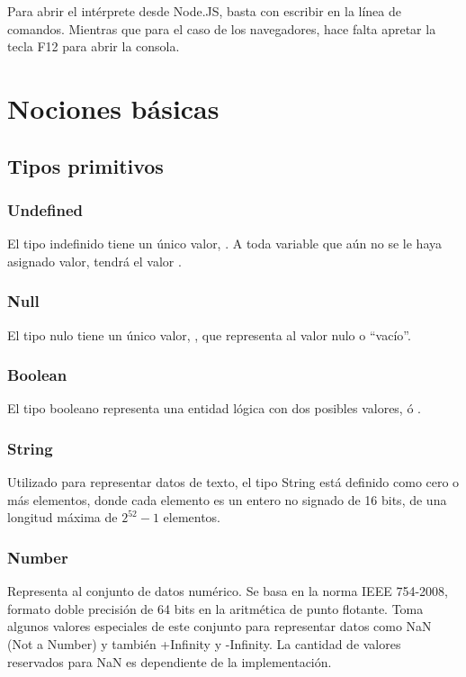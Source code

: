 Para abrir el intérprete desde Node.JS, basta con escribir  en la línea de comandos. Mientras que para el caso de los navegadores, hace falta apretar la tecla F12 para abrir la consola.


\section{Nociones básicas}

\subsection{Tipos primitivos}

\subsubsection{Undefined} 
El tipo indefinido tiene un único valor, . A toda variable que aún no se le haya asignado valor, tendrá el valor .

\subsubsection{Null} 
El tipo nulo tiene un único valor, , que representa al valor nulo o "`vacío"'.

\subsubsection{Boolean} 
El tipo booleano representa una entidad lógica con dos posibles valores,  ó .

\subsubsection{String} 
Utilizado para representar datos de texto, el tipo String está definido como cero o más elementos, donde cada elemento es un entero no signado de 16 bits, de una longitud máxima de $2^{52}-1$ elementos.

\subsubsection{Number} 
Representa al conjunto de datos numérico. Se basa en la norma IEEE 754-2008, formato doble precisión de 64 bits en la aritmética de punto flotante. Toma algunos valores especiales de este conjunto para representar datos como NaN (Not a Number) y también +Infinity y -Infinity. La cantidad de valores reservados para NaN es dependiente de la implementación.

